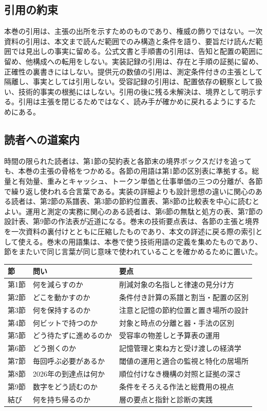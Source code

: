 \documentclass[lualatex,a4paper,10pt]{jlreq}
\begin{document}
\subsection*{引用の約束}
本巻の引用は、主張の出所を示すためのものであり、権威の飾りではない。一次資料の引用は、本文まで読んだ範囲でのみ構造と条件を語り、要旨だけ読んだ範囲では見出しの事実に留める。公式文書と手順書の引用は、告知と配置の範囲に留め、他構成への転用をしない。実装記録の引用は、存在と手順の証拠に留め、正確性の裏書きにはしない。提供元の数値の引用は、測定条件付きの主張として隔離し、事実としては引用しない。受容記録の引用は、配置依存の観察として扱い、技術的事実の根拠にはしない。引用の後に残る未解決は、境界として明示する。引用は主張を閉じるためではなく、読み手が確かめに戻れるようにするためにある。

\subsection*{読者への道案内}
時間の限られた読者は、第1節の契約表と各節末の境界ボックスだけを追っても、本巻の主張の骨格をつかめる。各節の用語は第1節の区別表に準拠する。総量と有効量、重みとキャッシュ、トークン単価と仕事単価の三つの分離が、各節で繰り返し使われる合言葉である。実装の詳細よりも設計思想の違いに関心のある読者は、第2節の系譜表、第3節の節約位置表、第8節の比較表を中心に読むとよい。運用と測定の実務に関心のある読者は、第6節の無駄と処方の表、第7節の設計表、第9節の作法表が近道になる。巻末の技術要点表は、各節の主張と境界を一次資料の裏付けとともに圧縮したものであり、本文の詳述に戻る際の索引として使える。巻末の用語集は、本巻で使う技術用語の定義を集めたものであり、節をまたいで同じ言葉が同じ意味で使われていることを確かめるために置いた。

\begin{center}
\small
\begin{tabularx}{\textwidth}{@{}p{}p{}X@{}}
\toprule
節 & 問い & 要点 \\
\midrule
第1節 & 何を減らすのか & 削減対象の名指しと律速の見分け方 \\
第2節 & どこを動かすのか & 条件付き計算の系譜と割当・配置の区別 \\
第3節 & 何を保持するのか & 注意と記憶の節約位置と置き場所の設計 \\
第4節 & 何ビットで持つのか & 対象と時点の分離と器・手法の区別 \\
第5節 & どう待たずに進めるのか & 受容率の物差しと予算表の運用 \\
第6節 & どう捌くのか & 記憶管理と束ね方と受け渡しの経済学 \\
第7節 & 毎回呼ぶ必要があるか & 閾値の運用と適合の監視と特化の居場所 \\
第8節 & 2026年の到達点は何か & 順位付けなき機構の対照と証拠の深さ \\
第9節 & 数字をどう読むのか & 条件をそろえる作法と総費用の視点 \\
結び & 何を持ち帰るのか & 層の要点と指針と診断の実践 \\
\bottomrule
\end{tabularx}
\end{center}
\end{document}
